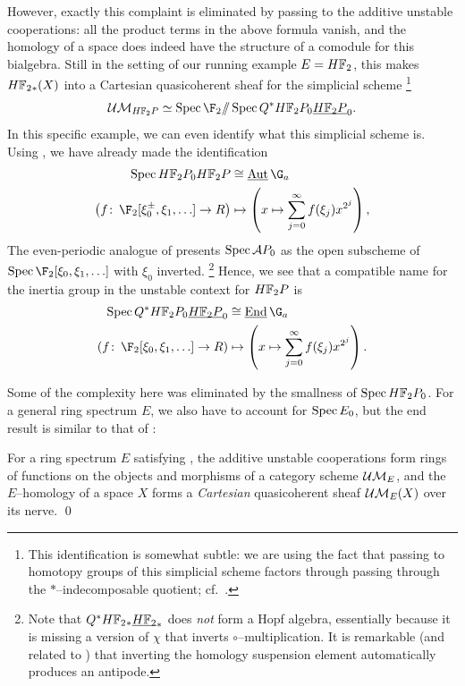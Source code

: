 However, exactly this complaint is eliminated by passing to the additive unstable cooperations: all the product terms in the above formula vanish, and the homology of a space does indeed have the structure of a comodule for this bialgebra.
Still in the setting of our running example \(E = \HFtwo\), this makes \(\HFtwo_*(X)\) into a Cartesian quasicoherent sheaf for the simplicial scheme%
\footnote{%
This identification is somewhat subtle: we are using the fact that passing to homotopy groups of this simplicial scheme factors through passing through the \(\ast\)--indecomposable quotient; cf.\ .
}
\[\Ucontext{\HFtwo P} \simeq \Spec \F_2 \mmod \Spec Q^* \HFtwo P_0 \OS{\HFtwo P}{0}.\]
In this specific example, we can even identify what this simplicial scheme is.
Using , we have already made the identification
\begin{align*}
\Spec \HFtwo P_0 \HFtwo P & \cong \InternalAut{\G_a} \\
\left(f\co \F_2[\xi_0^\pm, \xi_1, \ldots] \to R \right) & \mapsto \left(x \mapsto \sum_{j=0}^\infty f(\xi_j) x^{2^j}\right),
\end{align*}
The even-periodic analogue of  presents \(\operatorname{Spec} \mathcal A P_0\) as the open subscheme of \(\Spec \F_2[\xi_0, \xi_1, \ldots]\) with \(\xi_0\) inverted.%
\footnote{%
Note that \(Q^* \HFtwo_* \OS{\HFtwo}{*}\) does \emph{not} form a Hopf algebra, essentially because it is missing a version of \(\chi\) that inverts \(\circ\)--multiplication.
It is remarkable (and related to ) that inverting the homology suspension element automatically produces an antipode.
}
Hence, we see that a compatible name for the inertia group in the unstable context for \(\HFtwo P\) is
\begin{align*}
\Spec Q^* \HFtwo P_0 \OS{\HFtwo P}{0} & \cong \InternalEnd{\G_a} \\
\left(f\co \F_2[\xi_0, \xi_1, \ldots] \to R \right) & \mapsto \left(x \mapsto \sum_{j=0}^\infty f(\xi_j) x^{2^j}\right).
\end{align*}

Some of the complexity here was eliminated by the smallness of \(\Spec \HFtwo P_0\).
For a general ring spectrum \(E\), we also have to account for \(\operatorname{Spec} E_0\), but the end result is similar to that of :
\begin{lemma}
For a ring spectrum \(E\) satisfying {\UFH}, the additive unstable cooperations form rings of functions on the objects and morphisms of a category scheme \(\mathcal{UM}_{E}\), and the \(E\)--homology of a space \(X\) forms a \emph{Cartesian} quasicoherent sheaf \(\mathcal{UM}_{E}(X)\) over its nerve. \qed
\end{lemma}

